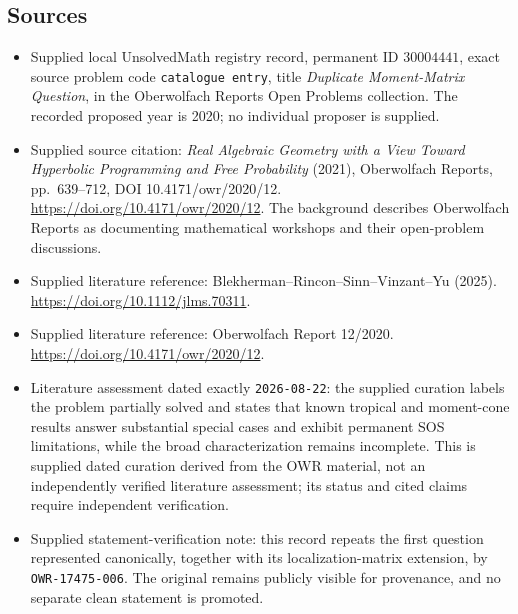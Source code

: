 \documentclass[11pt]{article}
\begin{document}
\subsection{Sources}
\begin{itemize}
\item Supplied local UnsolvedMath registry record, permanent ID \(30004441\), exact source problem code \texttt{catalogue entry}, title \emph{Duplicate Moment-Matrix Question}, in the Oberwolfach Reports Open Problems collection. The recorded proposed year is 2020; no individual proposer is supplied.
\item Supplied source citation: \emph{Real Algebraic Geometry with a View Toward Hyperbolic Programming and Free Probability} (2021), Oberwolfach Reports, pp.\ 639--712, DOI 10.4171/owr/2020/12. \url{https://doi.org/10.4171/owr/2020/12}. The background describes Oberwolfach Reports as documenting mathematical workshops and their open-problem discussions.
\item Supplied literature reference: Blekherman--Rincon--Sinn--Vinzant--Yu (2025). \url{https://doi.org/10.1112/jlms.70311}.
\item Supplied literature reference: Oberwolfach Report 12/2020. \url{https://doi.org/10.4171/owr/2020/12}.
\item Literature assessment dated exactly \texttt{2026-08-22}: the supplied curation labels the problem partially solved and states that known tropical and moment-cone results answer substantial special cases and exhibit permanent SOS limitations, while the broad characterization remains incomplete. This is supplied dated curation derived from the OWR material, not an independently verified literature assessment; its status and cited claims require independent verification.
\item Supplied statement-verification note: this record repeats the first question represented canonically, together with its localization-matrix extension, by \texttt{OWR-17475-006}. The original remains publicly visible for provenance, and no separate clean statement is promoted.
\end{itemize}
\end{document}

